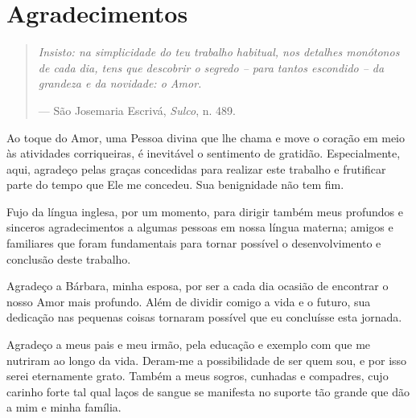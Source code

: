 %
\chapter*{Agradecimentos}
\label{sec:acknowledgement}

{\normalsize

    \begin{quotation}
        \itshape
        Insisto: na simplicidade do teu \emph{trabalho habitual}, nos detalhes monótonos de cada dia, tens que descobrir o segredo -- para tantos escondido -- da grandeza e da novidade: o Amor.

        \noindent --- S\~ao Josemaria Escriv\'a, \emph{Sulco}, n. 489.
    \end{quotation}

    \vspace{3em}

    Ao toque do Amor, uma Pessoa divina que lhe chama e move o cora\c c\~ao em meio \`as atividades corriqueiras, \'e inevit\'avel o sentimento de gratid\~ao. Especialmente, aqui, agrade\c co pelas gra\c cas concedidas para realizar este trabalho e frutificar parte do tempo que Ele me concedeu. Sua benignidade n\~ao tem fim.

    Fujo da l\'ingua inglesa, por um momento, para dirigir tamb\'em meus profundos e sinceros agradecimentos a algumas pessoas em nossa l\'ingua materna; amigos e familiares que foram fundamentais para tornar poss\'ivel o desenvolvimento e conclus\~ao deste trabalho.


    Agrade\c co a B\'arbara, minha esposa, por ser a cada dia ocasi\~ao de encontrar o nosso Amor mais profundo. Al\'em de dividir comigo a vida e o futuro, sua dedica\c c\~ao nas pequenas coisas tornaram poss\'ivel que eu conclu\'isse esta jornada.

    Agrade\c co a meus pais e meu irm\~ao, pela educa\c c\~ao e exemplo com que me nutriram ao longo da vida. Deram-me a possibilidade de ser quem sou, e por isso serei eternamente grato. Tamb\'em a meus sogros, cunhadas e compadres, cujo carinho forte tal qual la\c cos de sangue se manifesta no suporte t\~ao grande que d\~ao a mim e minha fam\'ilia.

}

